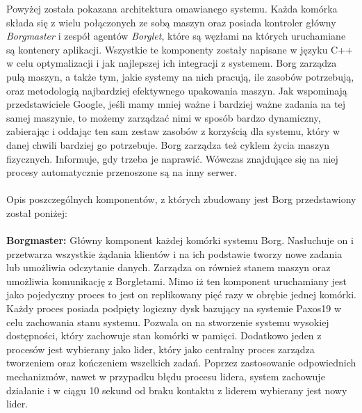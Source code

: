 \documentclass[12pt]{report}
\begin{document}
Powyżej została pokazana architektura omawianego systemu. Każda komórka składa się z wielu połączonych ze sobą maszyn oraz posiada kontroler główny {\it Borgmaster} i zespół agentów {\it Borglet}, które są węzłami na których uruchamiane są kontenery aplikacji. Wszystkie te komponenty zostały napisane w języku C++ w celu optymalizacji i jak najlepszej ich integracji z systemem. Borg zarządza pulą maszyn, a także tym, jakie systemy na nich pracują, ile zasobów potrzebują, oraz metodologią najbardziej efektywnego upakowania maszyn. Jak wspominają przedstawiciele Google, jeśli mamy mniej ważne i bardziej ważne zadania na tej samej maszynie, to możemy zarządzać nimi w sposób bardzo dynamiczny, zabierając i oddając ten sam zestaw zasobów z korzyścią dla systemu, który w danej chwili bardziej go potrzebuje. Borg zarządza też cyklem życia maszyn fizycznych. Informuje, gdy trzeba je naprawić. Wówczas znajdujące się na niej procesy automatycznie przenoszone są na inny serwer. \\ \\
Opis poszczególnych komponentów, z których zbudowany jest Borg przedstawiony został poniżej: \\ \\
{\bf Borgmaster:} Główny komponent każdej komórki systemu Borg. Nasłuchuje on i przetwarza wszystkie żądania klientów i na ich podstawie tworzy nowe zadania lub umożliwia odczytanie danych. Zarządza on również stanem maszyn oraz umożliwia komunikację z Borgletami. Mimo iż ten komponent uruchamiany jest jako pojedyczny proces to jest on replikowany pięć razy w obrębie jednej komórki. Każdy proces posiada podpięty logiczny dysk  bazujący na systemie Paxos19 w celu zachowania stanu systemu. Pozwala on na stworzenie systemu wysokiej dostępności, który zachowuje stan komórki w pamięci. Dodatkowo jeden z procesów jest wybierany jako lider, który jako centralny proces zarządza tworzeniem oraz kończeniem wszelkich zadań. Poprzez zastosowanie odpowiednich mechanizmów, nawet w przypadku błędu procesu lidera, system zachowuje działanie i w ciągu 10 sekund od braku kontaktu z liderem wybierany jest nowy lider. \\ \\
\end{document}
